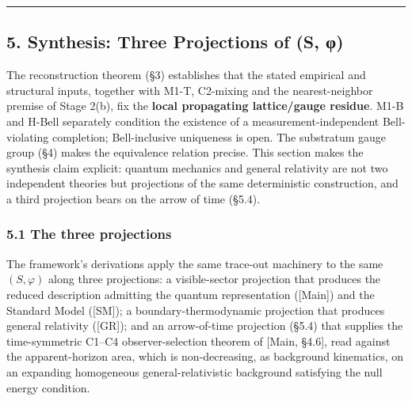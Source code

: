 \documentclass[
]{article}
\begin{document}
\begin{center}\rule{0.5\linewidth}{0.5pt}\end{center}

\hypertarget{synthesis-three-projections-of-s-ux3c6}{%
\subsection{5. Synthesis: Three Projections of (S,
φ)}\label{synthesis-three-projections-of-s-ux3c6}}

The reconstruction theorem (§3) establishes that the stated empirical
and structural inputs, together with M1-T, C2-mixing and the
nearest-neighbor premise of Stage 2(b), fix the \textbf{local
propagating lattice/gauge residue}. M1-B and H-Bell separately condition
the existence of a measurement-independent Bell-violating completion;
Bell-inclusive uniqueness is open. The substratum gauge group (§4) makes
the equivalence relation precise. This section makes the synthesis claim
explicit: quantum mechanics and general relativity are not two
independent theories but projections of the same deterministic
construction, and a third projection bears on the arrow of time (§5.4).

\hypertarget{the-three-projections}{%
\subsubsection{5.1 The three projections}\label{the-three-projections}}

The framework's derivations apply the same trace-out machinery to the
same \((S, \varphi)\) along three projections: a visible-sector
projection that produces the reduced description admitting the quantum
representation ({[}Main{]}) and the Standard Model ({[}SM{]}); a
boundary-thermodynamic projection that produces general relativity
({[}GR{]}); and an arrow-of-time projection (§5.4) that supplies the
time-symmetric C1--C4 observer-selection theorem of {[}Main, §4.6{]},
read against the apparent-horizon area, which is non-decreasing, as
background kinematics, on an expanding homogeneous general-relativistic
background satisfying the null energy condition.
\end{document}
